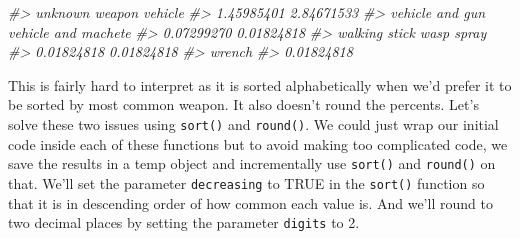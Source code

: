 \documentclass[
  12pt,
]{book}
\newenvironment{Shaded}{\begin{snugshade}}{\end{snugshade}}
\newcommand{\CommentTok}[1]{\textcolor[rgb]{0.37,0.37,0.37}{\textit{#1}}}
\begin{document}
\begin{Shaded}
\begin{Highlighting}[]
\CommentTok{\#>                   unknown weapon                          vehicle }
\CommentTok{\#>                       1.45985401                       2.84671533 }
\CommentTok{\#>                  vehicle and gun              vehicle and machete }
\CommentTok{\#>                       0.07299270                       0.01824818 }
\CommentTok{\#>                    walking stick                       wasp spray }
\CommentTok{\#>                       0.01824818                       0.01824818 }
\CommentTok{\#>                           wrench }
\CommentTok{\#>                       0.01824818}
\end{Highlighting}
\end{Shaded}

This is fairly hard to interpret as it is sorted alphabetically when we'd prefer it to be sorted by most common weapon. It also doesn't round the percents. Let's solve these two issues using \texttt{sort()} and \texttt{round()}. We could just wrap our initial code inside each of these functions but to avoid making too complicated code, we save the results in a temp object and incrementally use \texttt{sort()} and \texttt{round()} on that. We'll set the parameter \texttt{decreasing} to TRUE in the \texttt{sort()} function so that it is in descending order of how common each value is. And we'll round to two decimal places by setting the parameter \texttt{digits} to 2.
\end{document}
